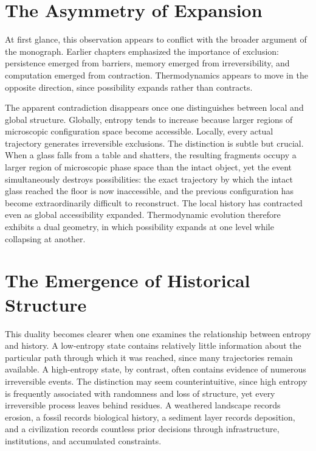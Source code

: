 \documentclass[11pt,oneside]{book}
\theoremstyle{plain}
\theoremstyle{definition}
\theoremstyle{remark}
\begin{document}
\section{The Asymmetry of Expansion}

At first glance, this observation appears to conflict with the broader argument of the monograph. Earlier chapters emphasized the importance of exclusion: persistence emerged from barriers, memory emerged from irreversibility, and computation emerged from contraction. Thermodynamics appears to move in the opposite direction, since possibility expands rather than contracts.

The apparent contradiction disappears once one distinguishes between local and global structure. Globally, entropy tends to increase because larger regions of microscopic configuration space become accessible. Locally, every actual trajectory generates irreversible exclusions. The distinction is subtle but crucial. When a glass falls from a table and shatters, the resulting fragments occupy a larger region of microscopic phase space than the intact object, yet the event simultaneously destroys possibilities: the exact trajectory by which the intact glass reached the floor is now inaccessible, and the previous configuration has become extraordinarily difficult to reconstruct. The local history has contracted even as global accessibility expanded. Thermodynamic evolution therefore exhibits a dual geometry, in which possibility expands at one level while collapsing at another.

\section{The Emergence of Historical Structure}

This duality becomes clearer when one examines the relationship between entropy and history. A low-entropy state contains relatively little information about the particular path through which it was reached, since many trajectories remain available. A high-entropy state, by contrast, often contains evidence of numerous irreversible events. The distinction may seem counterintuitive, since high entropy is frequently associated with randomness and loss of structure, yet every irreversible process leaves behind residues. A weathered landscape records erosion, a fossil records biological history, a sediment layer records deposition, and a civilization records countless prior decisions through infrastructure, institutions, and accumulated constraints.
\end{document}
